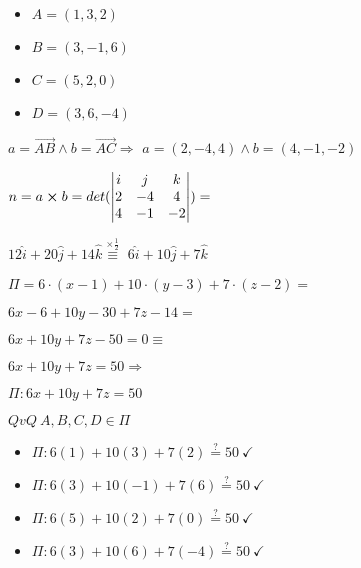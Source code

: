 \documentclass[../practica_01.tex]{subfiles}
\begin{document}
    \begin{itemize}
        \item $A = (1, 3, 2) $
        \item $B = (3,-1, 6) $
        \item $C = (5, 2, 0) $
        \item $D = (3, 6,-4) $
    \end{itemize}

    $a = \overrightarrow{AB} \wedge b = \overrightarrow{AC} \Rightarrow $ 
    $a = (2,-4,4) \wedge b = (4,-1,-2)$

    $ n = a \crossproduct b = det(\begin{vmatrix}
        i &  j &  k \\
        2 & -4 &  4 \\
        4 & -1 & -2
    \end{vmatrix}) = $
    
    $12 \widehat{i} + 20 \widehat{j} + 14\widehat{k} \stackrel{\times \frac{1}{2}}{\equiv} $
    $ 6\widehat{i} + 10 \widehat{j} + 7 \widehat{k} $

    $\Pi = 6\cdot(x-1) + 10\cdot(y-3) + 7\cdot(z-2) = $

    $ 6x - 6 + 10y - 30 + 7z - 14 = $

    $ 6x + 10y + 7z - 50 = 0 \equiv$

    $ 6x + 10y + 7z = 50 \Rightarrow$

    $\Pi: 6x + 10y + 7z = 50$

    $QvQ\ A,B,C,D \in \Pi$

    \begin{itemize}
        \item $\Pi: 6(1) + 10(3) + 7(2) \stackrel{?}{=} 50\ \checkmark$
        \item $\Pi: 6(3) + 10(-1) + 7(6) \stackrel{?}{=} 50\ \checkmark$
        \item $\Pi: 6(5) + 10(2) + 7(0) \stackrel{?}{=} 50\ \checkmark$
        \item $\Pi: 6(3) + 10(6) + 7(-4) \stackrel{?}{=} 50\ \checkmark$
    \end{itemize}
\end{document}
